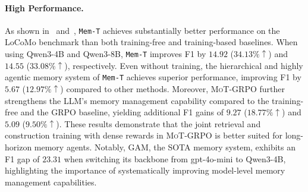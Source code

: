 \documentclass[11pt, a4paper]{lumia}
\newcommand{\ourmethod}{{\texttt{Mem-T}}\xspace} %
\newcommand{\ourtrain}{{\textsc{MoT-GRPO}}\xspace} %
\begin{document}
\paragraph{High Performance.}
As shown in~ and~, \ourmethod achieves substantially better performance on the LoCoMo benchmark than both training-free and training-based baselines. 
When using Qwen3-4B and Qwen3-8B, \ourmethod improves F1 by $14.92$ ($34.13\%\uparrow$) and $14.55$ ($33.08\%\uparrow$), respectively. 
Even without training, the hierarchical and highly agentic memory system of \ourmethod achieves superior performance, improving F1 by $5.67$ ($12.97\%\uparrow$) compared to other methods.
Moreover, \ourtrain further strengthens the LLM's memory management capability compared to the training-free and the GRPO baseline, yielding additional F1 gains of $9.27$ ($18.77\%\uparrow$) and $5.09$ ($9.50\%\uparrow$). 
These results demonstrate that the joint retrieval and construction training with dense rewards in \ourtrain is better suited for long-horizon memory agents. 
Notably, GAM, the SOTA memory system, exhibits an F1 gap of $23.31$ when switching its backbone from gpt-4o-mini to Qwen3-4B, highlighting the importance of systematically improving model-level memory management capabilities. 
\end{document}
